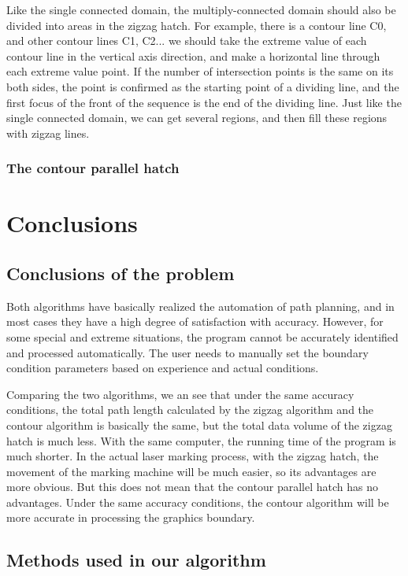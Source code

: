 \documentclass{apmcmthesis}
\begin{document}
 Like the single connected domain, the multiply-connected domain should also be divided into areas in the zigzag hatch. For example, there is a contour line C0, and other contour lines C1, C2... we should take the extreme value of each contour line in the vertical axis direction, and make a horizontal line through each extreme value point. If the number of intersection points is the same on its both sides, the point is confirmed as the starting point of a dividing line, and the first focus of the front of the sequence is the end of the dividing line. Just like the single connected domain, we can get several regions, and then fill these regions with zigzag lines.


\subsubsection{The contour parallel hatch}

\section{Conclusions}

\subsection{Conclusions of the problem}

Both algorithms have basically realized the automation of path planning, and in most cases they have a high degree of satisfaction with accuracy. However, for some special and extreme situations, the program cannot be accurately identified and processed automatically. The user needs to manually set the boundary condition parameters based on experience and actual conditions.


Comparing the two algorithms, we an see that under the same accuracy conditions, the total path length calculated by the zigzag algorithm and the contour algorithm is basically the same, but the total data volume of the zigzag hatch is much less. With the same computer, the running time of the program is much shorter. In the actual laser marking process, with the zigzag hatch, the movement of the marking machine will be much easier, so its advantages are more obvious. But this does not mean that the contour parallel hatch has no advantages. Under the same accuracy conditions, the contour algorithm will be more accurate in processing the graphics boundary.


\subsection{Methods used in our algorithm}
\end{document}
